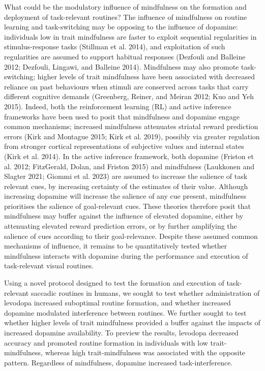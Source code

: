 \documentclass{article}
\begin{document}
What could be the modulatory influence of mindfulness on the formation
and deployment of task-relevant routines? The influence of mindfulness
on routine learning and task-switching may be opposing to the influence
of dopamine: individuals low in trait mindfulness are faster to exploit
sequential regularities in stimulus-response tasks (Stillman et al.
2014), and exploitation of such regularities are assumed to support
habitual responses (Dezfouli and Balleine 2012; Dezfouli, Lingawi, and
Balleine 2014). Mindfulness may also promote task-switching; higher
levels of trait mindfulness have been associated with decreased reliance
on past behaviours when stimuli are conserved across tasks that carry
different cognitive demands (Greenberg, Reiner, and Meiran 2012; Kuo and
Yeh 2015). Indeed, both the reinforcement learning (RL) and active
inference frameworks have been used to posit that mindfulness and
dopamine engage common mechanisms; increased mindfulness attenuates
striatal reward prediction errors (Kirk and Montague 2015; Kirk et al.
2019), possibly via greater regulation from stronger cortical
representations of subjective values and internal states (Kirk et al.
2014). In the active inference framework, both dopamine (Friston et al.
2012; FitzGerald, Dolan, and Friston 2015) and mindfulness (Laukkonen
and Slagter 2021; Giommi et al. 2023) are assumed to increase the
salience of task relevant cues, by increasing certainty of the estimates
of their value. Although increasing dopamine will increase the salience
of any cue present, mindfulness prioritises the salience of
goal-relevant cues. These theories therefore posit that mindfulness may
buffer against the influence of elevated dopamine, either by attenuating
elevated reward prediction errors, or by further amplifying the salience
of cues according to their goal-relevance. Despite these assumed common
mechanisms of influence, it remains to be quantitatively tested whether
mindfulness interacts with dopamine during the performance and execution
of task-relevant visual routines.

Using a novel protocol designed to test the formation and execution of
task-relevant saccadic routines in humans, we sought to test whether
administration of levodopa increased suboptimal routine formation, and
whether increased dopamine modulated interference between routines. We
further sought to test whether higher levels of trait mindfulness
provided a buffer against the impacts of increased dopamine
availability. To preview the results, levodopa decreased accuracy and
promoted routine formation in individuals with low trait-mindfulness,
whereas high trait-mindfulness was associated with the opposite pattern.
Regardless of mindfulness, dopamine increased task-interference.
\end{document}
